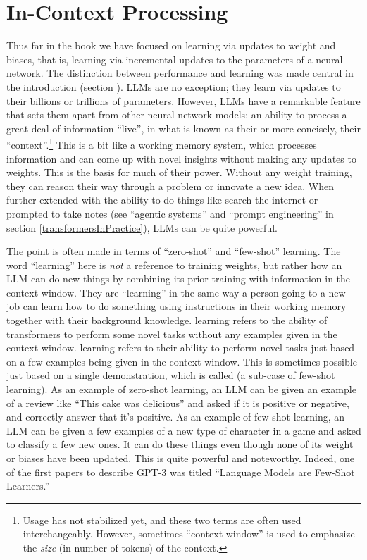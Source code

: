 \section{In-Context Processing}\label{inContext}

Thus far in the book we have focused on learning via updates to weight
and biases, that is, learning via incremental updates to the parameters of a neural
network. The distinction between performance and learning was made
central in the introduction (section
). LLMs are no exception; they learn via updates to their billions or trillions of
parameters. However, LLMs have a remarkable feature that sets them apart from other neural
network models: an ability to process a great deal of information ``live'', in
what is known as their  or more concisely, their ``context''.\footnote{Usage has not stabilized yet, and these two terms are often used interchangeably. However, sometimes ``context window'' is used to emphasize the \emph{size} (in number of tokens) of the context.} This is a bit like a working memory system, which processes information and can come up with novel insights without making any updates to weights. This is the basis for much of their power. Without any weight training, they
can reason their way through a problem or innovate a new idea. When further
extended with the ability to do things like search the internet or prompted to take notes (see ``agentic
systems'' and ``prompt engineering'' in section
\ref{transformersInPractice}), LLMs can be quite powerful.

The point is often made in terms of ``zero-shot'' and ``few-shot''
learning. The word ``learning'' here is \emph{not} a reference to training weights, but rather how an LLM can do new things by combining its prior training with information in the context window.  They are ``learning'' in the same way  a person going to a new job can learn how to do something using instructions in their working memory together with their background knowledge.  learning refers to the ability of transformers
to perform some novel tasks without any examples given in the context window. 
learning refers to their ability to perform novel tasks just based on a few examples being given in the context window. This is sometimes possible just based on a single demonstration, which is called  (a sub-case of few-shot learning).  As an example of zero-shot learning, an LLM can be given an example of a review like ``This cake was delicious'' and asked if it is positive or
negative, and correctly answer that it's positive. As an example of few shot learning, an LLM can be given a few examples of a new type of character in a game and asked to classify a few new ones. It can do these things
even though none of its weight or biases have been updated. This is quite powerful and
noteworthy. Indeed, one of the first papers to describe GPT-3 was titled ``Language
Models are Few-Shot Learners.''

